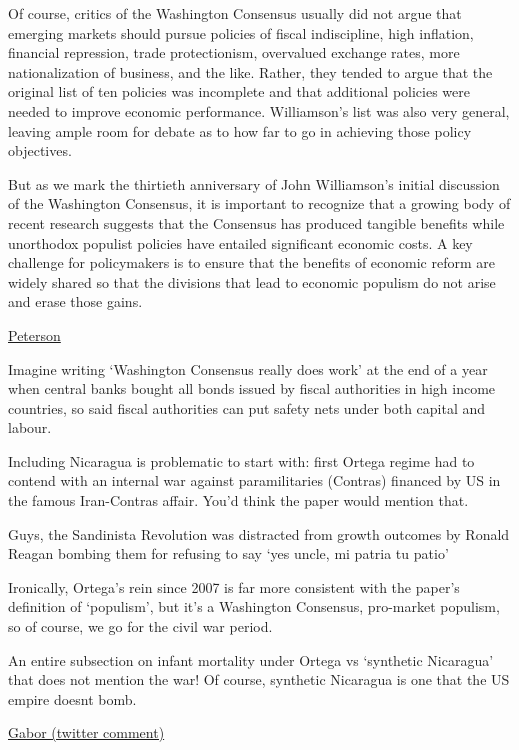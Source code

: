 \documentclass[
]{book}
\begin{document}
Of course, critics of the Washington Consensus usually did not argue that emerging markets should pursue policies of fiscal indiscipline, high inflation, financial repression, trade protectionism, overvalued exchange rates, more nationalization of business, and the like. Rather, they tended to argue that the original list of ten policies was incomplete and that additional policies were needed to improve economic performance. Williamson's list was also very general, leaving ample room for debate as to how far to go in achieving those policy objectives.

But as we mark the thirtieth anniversary of John Williamson's initial discussion of the Washington Consensus, it is important to recognize that a growing body of recent research suggests that the Consensus has produced tangible benefits while unorthodox populist policies have entailed significant economic costs. A key challenge for policymakers is to ensure that the benefits of economic reform are widely shared so that the divisions that lead to economic populism do not arise and erase those gains.

\href{https://www.piie.com/blogs/realtime-economic-issues-watch/washington-consensus-stands-test-time-better-populist-policies}{Peterson}

Imagine writing `Washington Consensus really does work' at the end of a year when central banks bought all bonds issued by fiscal authorities in high income countries, so said fiscal authorities can put safety nets under both capital and labour.

Including Nicaragua is problematic to start with:
first Ortega regime had to contend with an internal war against paramilitaries (Contras) financed by US in the famous Iran-Contras affair.
You'd think the paper would mention that.

Guys, the Sandinista Revolution was distracted from growth outcomes by Ronald Reagan bombing them for refusing to say `yes uncle, mi patria tu patio'

Ironically, Ortega's rein since 2007 is far more consistent with the paper's definition of `populism', but it's a Washington Consensus, pro-market populism, so of course, we go for the civil war period.

An entire subsection on infant mortality under Ortega vs `synthetic Nicaragua' that does not mention the war!
Of course, synthetic Nicaragua is one that the US empire doesnt bomb.

\href{https://twitter.com/DanielaGabor/status/1378959312110956544}{Gabor (twitter comment)}
\end{document}
